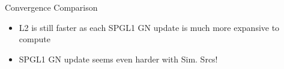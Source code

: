 \documentclass[12pt]{beamer}
\begin{document}
\begin{frame}{Convergence Comparison}

\begin{figure}
\end{figure}
\begin{itemize}
  \item L2 is still faster as each SPGL1 GN update is much more expansive to compute
  \item SPGL1 GN update seems even harder with Sim. Srcs!
\end{itemize}
\end{frame}
\end{document}
